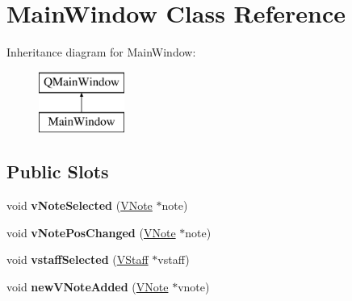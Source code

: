 \hypertarget{class_main_window}{}\section{Main\+Window Class Reference}
\label{class_main_window}
Inheritance diagram for Main\+Window\+:\begin{figure}[H]
\begin{center}
\leavevmode
\includegraphics[height=2.000000cm]{class_main_window}
\end{center}
\end{figure}
\subsection*{Public Slots}
\begin{DoxyCompactItemize}
\item 
\hypertarget{class_main_window_a5efd5117f1bad9f03e909b6865099e5b}{}void {\bfseries v\+Note\+Selected} (\hyperlink{class_v_note}{V\+Note} $\ast$note)\label{class_main_window_a5efd5117f1bad9f03e909b6865099e5b}

\item 
\hypertarget{class_main_window_a2cf6671f3b110419e7d9704966334235}{}void {\bfseries v\+Note\+Pos\+Changed} (\hyperlink{class_v_note}{V\+Note} $\ast$note)\label{class_main_window_a2cf6671f3b110419e7d9704966334235}

\item 
\hypertarget{class_main_window_a6cd57f6ba7f45bc7f1e723aa99ada0f0}{}void {\bfseries vstaff\+Selected} (\hyperlink{class_v_staff}{V\+Staff} $\ast$vstaff)\label{class_main_window_a6cd57f6ba7f45bc7f1e723aa99ada0f0}

\item 
\hypertarget{class_main_window_ab76ad97e59b1bc8be3bf8dc05cc37ecb}{}void {\bfseries new\+V\+Note\+Added} (\hyperlink{class_v_note}{V\+Note} $\ast$vnote)\label{class_main_window_ab76ad97e59b1bc8be3bf8dc05cc37ecb}

\end{DoxyCompactItemize}
